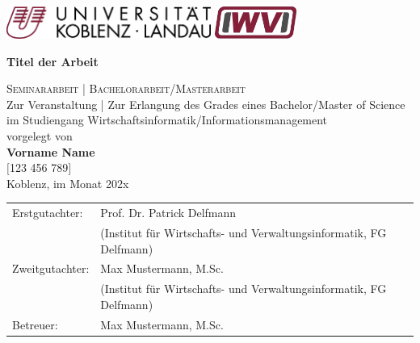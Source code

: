 \begin{titlepage}
	\includegraphics[height=30pt]{img/logo-uni-rot}
	\hfill
	\includegraphics[height=30pt]{img/logo-iwvi-rot}

	\begin{center}
	\vspace{2.5cm}	
	
	\huge\textbf{\sffamily Titel der Arbeit} %
	\\ \normalsize {} %
	
	\vspace{2cm}


	\normalsize
	\vspace{1.5cm}	

	\textsc{\Large Seminararbeit | Bachelorarbeit/Masterarbeit}\\Zur Veranstaltung | Zur Erlangung des Grades eines Bachelor/Master of Science im Studiengang Wirtschaftsinformatik/Informationsmanagement\\[2cm] %
		
	vorgelegt von\\
	
	\textbf{\Large Vorname Name}\\ $ [ $123 456 789$ ] $\\ [1.5cm] %
	Koblenz, im Monat 202x %
	\end{center}
	\vfill
	\begin{tabular}{ll}
		Erstgutachter: & Prof. Dr. Patrick Delfmann\\ %
		 & \small{(Institut f\"ur Wirtschafts- und Verwaltungsinformatik, FG Delfmann)}\\
		Zweitgutachter: & Max Mustermann, M.Sc. \\ %
		 & \small{(Institut f\"ur Wirtschafts- und Verwaltungsinformatik, FG Delfmann)}\\
		Betreuer:  & Max Mustermann, M.Sc. %
	\end{tabular}
\end{titlepage}
